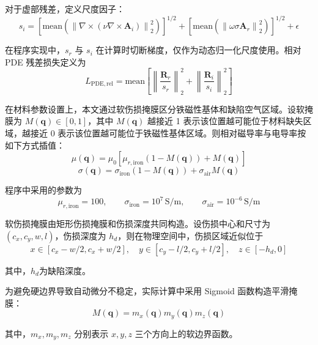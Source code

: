 对于虚部残差，定义尺度因子：
\begin{equation}
\label{eq:scale_imag}
s_i
=
\left[
\mathrm{mean}
\left(
\left\|
\nabla\times
\left(
\nu\nabla\times \mathbf A_i
\right)
\right\|_2^2
\right)
\right]^{1/2}
+
\left[
\mathrm{mean}
\left(
\left\|
\omega\sigma \mathbf A_r
\right\|_2^2
\right)
\right]^{1/2}
+
\epsilon
\end{equation}

在程序实现中，$s_r$ 与 $s_i$ 在计算时切断梯度，仅作为动态归一化尺度使用。相对 PDE 残差损失定义为
\begin{equation}
\label{eq:pde_relative_loss}
L_{\mathrm{PDE,rel}}
=
\mathrm{mean}
\left[
\left\|
\frac{\mathbf R_r}{s_r}
\right\|_2^2
+
\left\|
\frac{\mathbf R_i}{s_i}
\right\|_2^2
\right]
\end{equation}

在材料参数设置上，本文通过软伤损掩膜区分铁磁性基体和缺陷空气区域。设软掩膜为 $M(\mathbf q)\in[0,1]$，其中 $M(\mathbf q)$ 越接近 1 表示该位置越可能位于材料缺失区域，越接近 0 表示该位置越可能位于铁磁性基体区域。则相对磁导率与电导率按如下方式插值：
\begin{equation}
\label{eq:mu_soft_mask}
\mu(\mathbf q)
=
\mu_0
\left[
\mu_{r,\mathrm{iron}}
\left(
1-M(\mathbf q)
\right)
+
M(\mathbf q)
\right]
\end{equation}
\begin{equation}
\label{eq:sigma_soft_mask}
\sigma(\mathbf q)
=
\sigma_{\mathrm{iron}}
\left(
1-M(\mathbf q)
\right)
+
\sigma_{\mathrm{air}}M(\mathbf q)
\end{equation}

程序中采用的参数为
\[
\mu_{r,\mathrm{iron}}=100,\qquad
\sigma_{\mathrm{iron}}=10^7\,\mathrm{S/m},\qquad
\sigma_{\mathrm{air}}=10^{-6}\,\mathrm{S/m}
\]

软伤损掩膜由矩形伤损掩膜和伤损深度共同构造。设伤损中心和尺寸为 $(c_x,c_y,w,l)$，伤损深度为 $h_d$，则在物理空间中，伤损区域近似位于
\[
x\in[c_x-w/2,c_x+w/2],
\quad
y\in[c_y-l/2,c_y+l/2],
\quad
z\in[-h_d,0]
\]

其中，$h_d$为缺陷深度。

为避免硬边界导致自动微分不稳定，实际计算中采用 Sigmoid 函数构造平滑掩膜：
\begin{equation}
\label{eq:soft_mask}
M(\mathbf q)
=
m_x(\mathbf q)m_y(\mathbf q)m_z(\mathbf q)
\end{equation}

其中，$m_x,m_y,m_z$ 分别表示 $x,y,z$ 三个方向上的软边界函数。


